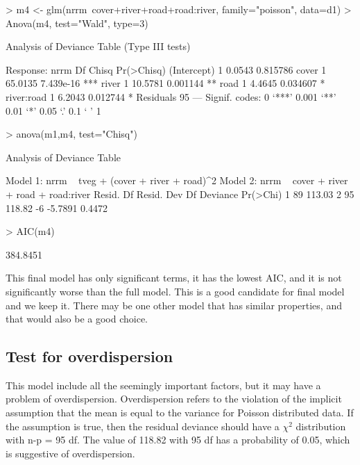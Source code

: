 \documentclass{article}
\begin{document}
\begin{Schunk}
\begin{Sinput}
> m4 <- glm(nrrm~cover+river+road+road:river, family="poisson", data=d1)
> Anova(m4, test="Wald", type=3)
\end{Sinput}
\begin{Soutput}
Analysis of Deviance Table (Type III tests)

Response: nrrm
            Df   Chisq Pr(>Chisq)    
(Intercept)  1  0.0543   0.815786    
cover        1 65.0135  7.439e-16 ***
river        1 10.5781   0.001144 ** 
road         1  4.4645   0.034607 *  
river:road   1  6.2043   0.012744 *  
Residuals   95                       
---
Signif. codes:  0 ‘***’ 0.001 ‘**’ 0.01 ‘*’ 0.05 ‘.’ 0.1 ‘ ’ 1
\end{Soutput}
\begin{Sinput}
> anova(m1,m4, test="Chisq")
\end{Sinput}
\begin{Soutput}
Analysis of Deviance Table

Model 1: nrrm ~ tveg + (cover + river + road)^2
Model 2: nrrm ~ cover + river + road + road:river
  Resid. Df Resid. Dev Df Deviance Pr(>Chi)
1        89     113.03                     
2        95     118.82 -6  -5.7891   0.4472
\end{Soutput}
\begin{Sinput}
> AIC(m4)
\end{Sinput}
\begin{Soutput}
[1] 384.8451
\end{Soutput}
\end{Schunk}

This final model has only significant terms, it has the lowest AIC, and it is not significantly worse than the full model. This is a good candidate for final model and we keep it. There may be one other model that has similar properties, and that would also be a good choice.

\subsection{Test for overdispersion}
This model include all the seemingly important factors, but it may have a problem of overdispersion. Overdispersion refers to the violation of the implicit assumption that the mean is equal to the variance for Poisson distributed data. If the assumption is true, then the residual deviance should have a $\chi^2$ distribution with n-p = 95 df. The value of 118.82 with 95 df has a probability of 0.05, which is suggestive of overdispersion.
\end{document}
